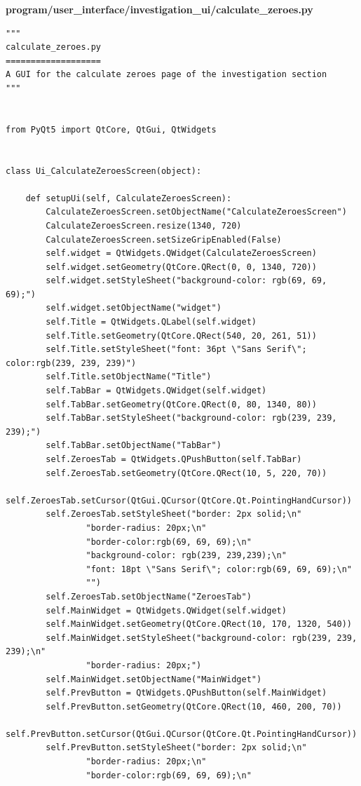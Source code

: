 \documentclass[12pt]{article}
\begin{document}
\textbf{program/user\_interface/investigation\_ui/calculate\_zeroes.py}
\begin{lstlisting}
"""
calculate_zeroes.py
===================
A GUI for the calculate zeroes page of the investigation section
"""


from PyQt5 import QtCore, QtGui, QtWidgets


class Ui_CalculateZeroesScreen(object):

    def setupUi(self, CalculateZeroesScreen):
        CalculateZeroesScreen.setObjectName("CalculateZeroesScreen")
        CalculateZeroesScreen.resize(1340, 720)
        CalculateZeroesScreen.setSizeGripEnabled(False)
        self.widget = QtWidgets.QWidget(CalculateZeroesScreen)
        self.widget.setGeometry(QtCore.QRect(0, 0, 1340, 720))
        self.widget.setStyleSheet("background-color: rgb(69, 69, 69);")
        self.widget.setObjectName("widget")
        self.Title = QtWidgets.QLabel(self.widget)
        self.Title.setGeometry(QtCore.QRect(540, 20, 261, 51))
        self.Title.setStyleSheet("font: 36pt \"Sans Serif\"; color:rgb(239, 239, 239)")
        self.Title.setObjectName("Title")
        self.TabBar = QtWidgets.QWidget(self.widget)
        self.TabBar.setGeometry(QtCore.QRect(0, 80, 1340, 80))
        self.TabBar.setStyleSheet("background-color: rgb(239, 239, 239);")
        self.TabBar.setObjectName("TabBar")
        self.ZeroesTab = QtWidgets.QPushButton(self.TabBar)
        self.ZeroesTab.setGeometry(QtCore.QRect(10, 5, 220, 70))
        self.ZeroesTab.setCursor(QtGui.QCursor(QtCore.Qt.PointingHandCursor))
        self.ZeroesTab.setStyleSheet("border: 2px solid;\n"
                "border-radius: 20px;\n"
                "border-color:rgb(69, 69, 69);\n"
                "background-color: rgb(239, 239,239);\n"
                "font: 18pt \"Sans Serif\"; color:rgb(69, 69, 69);\n"
                "")
        self.ZeroesTab.setObjectName("ZeroesTab")
        self.MainWidget = QtWidgets.QWidget(self.widget)
        self.MainWidget.setGeometry(QtCore.QRect(10, 170, 1320, 540))
        self.MainWidget.setStyleSheet("background-color: rgb(239, 239, 239);\n"
                "border-radius: 20px;")
        self.MainWidget.setObjectName("MainWidget")
        self.PrevButton = QtWidgets.QPushButton(self.MainWidget)
        self.PrevButton.setGeometry(QtCore.QRect(10, 460, 200, 70))
        self.PrevButton.setCursor(QtGui.QCursor(QtCore.Qt.PointingHandCursor))
        self.PrevButton.setStyleSheet("border: 2px solid;\n"
                "border-radius: 20px;\n"
                "border-color:rgb(69, 69, 69);\n"

\end{lstlisting}
\end{document}
